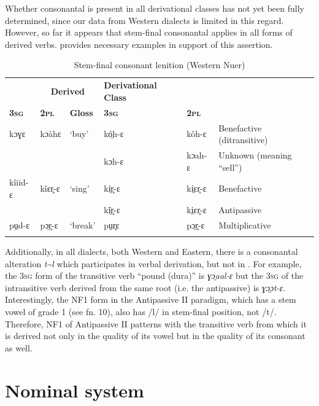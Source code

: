 \documentclass[output=paper
,newtxmath
,modfonts
,nonflat]{langsci/langscibook}
\begin{document}
Whether consonantal  is present in all derivational classes has not yet been fully determined, since our data from Western  dialects is limited in this regard.  However, so far it appears that stem-final consonantal  applies in all forms of derived verbs.  provides necessary examples in support of this assertion. 

\begin{table}
\begin{tabularx}{\textwidth}{llllll}
\lsptoprule

\multicolumn{3}{c}{\bfseries Transitive} & \multicolumn{2}{c}{\bfseries Derived} & \bfseries Derivational Class\\
\bfseries\scshape 3sg & \bfseries\scshape 2pl & \bfseries Gloss & \bfseries\scshape 3sg & \multicolumn{1}{l}{\bfseries\scshape 2pl} & \\
\midrule
kɔɣɛ & kɔàhɛ & ‘buy’ & kó̤h-ɛ & kôh-ɛ & Benefactive (ditransitive)\\
&  &  & kɔh-ɛ & kɔah-ɛ & Unknown (meaning “sell”)\\

\tablevspace
kîiid-ɛ & kǐɛr̥-ɛ & ‘sing’ & kí̤r̥-ɛ & kí̤ɛr̥-ɛ & Benefactive\\
&  &  & kǐ̤r̥-ɛ & ki̤ɛr̥-ɛ & Antipassive\\

\tablevspace
pṳd-ɛ & pɔ̤r̥-ɛ & ‘break’ & pṳr̥ɛ & pɔ̤r̥-ɛ & Multiplicative\\
\lspbottomrule
\end{tabularx}
\caption{Stem-final consonant lenition (Western Nuer)}
\label{tab:monich:16}
\end{table}

Additionally, in all  dialects, both Western and Eastern, there is a consonantal alteration \textit{t{\textasciitilde}l} which participates in verbal derivation, but not in .  For example, the 3\textsc{sg} form of the transitive verb “pound (dura)” is \textit{ɣɔ̤aal-ɛ} but the 3\textsc{sg} of the intransitive verb derived from the same root (i.e. the antipassive) is \textit{ɣɔ̤ɔt-ɛ}.  Interestingly, the NF1 form in the Antipassive II paradigm, which has a stem vowel of grade 1 (see fn. 10), also has /l/ in stem-final position, not /t/.  Therefore, NF1 of Antipassive II patterns with the transitive verb from which it is derived not only in the quality of its vowel but in the quality of its consonant as well.

\section{Nominal system}
\end{document}
